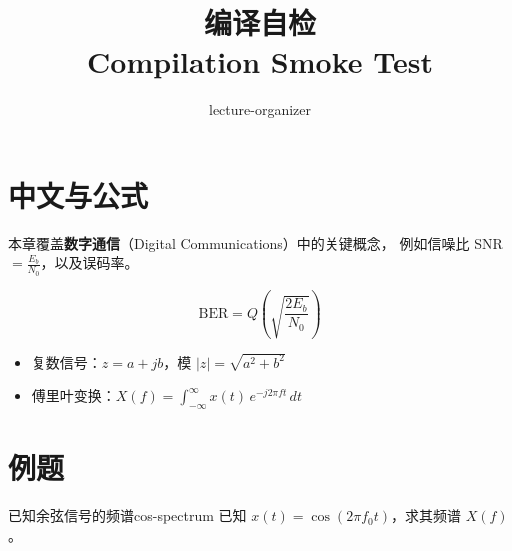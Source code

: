 \documentclass[11pt]{ctexart}
\title{编译自检 \\ Compilation Smoke Test}
\author{lecture-organizer}
\date{}
\begin{document}
\maketitle

\section{中文与公式}
本章覆盖\textbf{数字通信}（Digital Communications）中的关键概念，
例如信噪比 SNR $= \frac{E_b}{N_0}$，以及误码率。

\begin{equation}
\text{BER} = Q\left(\sqrt{\frac{2E_b}{N_0}}\right)
\end{equation}

\begin{itemize}
  \item 复数信号：$z = a + jb$，模 $|z| = \sqrt{a^2 + b^2}$
  \item 傅里叶变换：$\displaystyle X(f) = \int_{-\infty}^{\infty} x(t)\,e^{-j2\pi ft}\,dt$
\end{itemize}

\section{例题}
\begin{examplebox}{已知余弦信号的频谱}{cos-spectrum}
已知 $x(t) = \cos(2\pi f_0 t)$，求其频谱 $X(f)$。
\end{examplebox}
\end{document}
